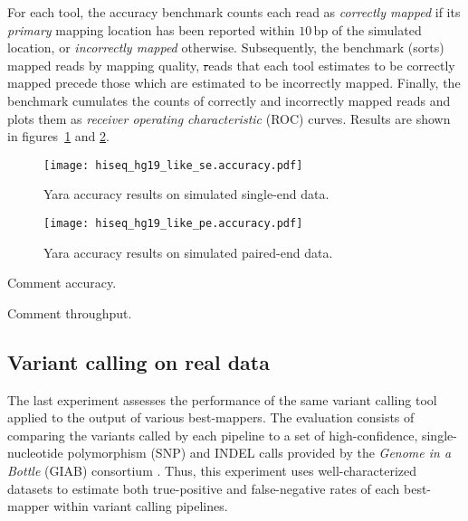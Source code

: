 For each tool, the accuracy benchmark counts each read as \emph{correctly mapped} if its \emph{primary} mapping location has been reported within $10\,\text{bp}$ of the simulated location, or \emph{incorrectly mapped} otherwise.
Subsequently, the benchmark  (\ie sorts) mapped reads by mapping quality, \st reads that each tool estimates to be correctly mapped precede those which are estimated to be incorrectly mapped.
Finally, the benchmark cumulates the counts of correctly and incorrectly mapped reads and plots them as \emph{receiver operating characteristic} (ROC) curves.
Results are shown in figures~\ref{fig:yara:accuracy-se} and \ref{fig:yara:accuracy-pe}.

\begin{figure}[t]
\begin{center}
\caption[Yara accuracy results on simulated single-end data]{Yara accuracy results on simulated single-end data.}
\label{fig:yara:accuracy-se}
\texttt{[image: hiseq\_hg19\_like\_se.accuracy.pdf]}
\end{center}
\end{figure}


\begin{figure}[t]
\begin{center}
\caption[Yara accuracy results on simulated paired-end data]{Yara accuracy results on simulated paired-end data.}
\label{fig:yara:accuracy-pe}
\texttt{[image: hiseq\_hg19\_like\_pe.accuracy.pdf]}
\end{center}
\end{figure}

Comment accuracy.

Comment throughput.

\subsection{Variant calling on real data}

The last experiment assesses the performance of the same variant calling tool applied to the output of various best-mappers.
The evaluation consists of comparing the variants called by each pipeline to a set of high-confidence, single-nucleotide polymorphism (SNP) and INDEL calls provided by the \emph{Genome in a Bottle} (GIAB) consortium \cite{Zook2014}.
Thus, this experiment uses well-characterized datasets to estimate both true-positive and false-negative rates of each best-mapper within variant calling pipelines.

